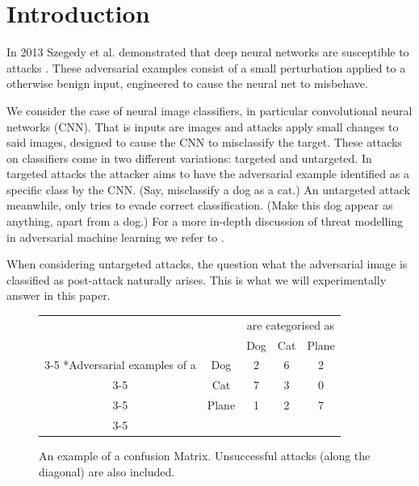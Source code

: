 \documentclass{article}
\begin{document}
\section{Introduction}



In 2013 Szegedy et al. demonstrated that deep neural networks are susceptible to attacks \cite{Szegedy13}. These adversarial examples consist of a small perturbation applied to a otherwise benign input, engineered to cause the neural net to misbehave.

We consider the case of neural image classifiers, in particular convolutional neural networks (CNN).
That is inputs are images and attacks apply small changes to said images, designed to cause the CNN to misclassify the target. These attacks on classifiers come in two different variations: targeted and untargeted.
In targeted attacks the attacker aims to have the adversarial example identified as a specific class by the CNN. (Say, misclassify a dog as a cat.)
An untargeted attack meanwhile, only tries to evade correct classification. (Make this dog appear as anything, apart from a dog.)
For a more in-depth discussion of threat modelling in adversarial machine learning we refer to \cite{biggio2018wild}.

When considering untargeted attacks, the question what the adversarial image is classified as post-attack naturally arises. This is what we will experimentally answer in this paper.

\begin{figure}[h]
	\begin{tabular}{cc|c|c|c|}
		& \multicolumn{1}{c}{} & \multicolumn{3}{c}{are categorised as}\\
		& \multicolumn{1}{c}{} & \multicolumn{1}{c}{Dog}  & \multicolumn{1}{c}{Cat} & \multicolumn{1}{c}{Plane} \\\cline{3-5}
		\multirow{3}*{Adversarial examples of a}  & Dog & 2 & 6 & 2\\\cline{3-5}
		& Cat & 7 & 3 &  0 \\\cline{3-5}
		& Plane & 1 & 2 &  7 \\\cline{3-5}
	\end{tabular}

	\caption{An example of a confusion Matrix. Unsuccessful attacks (along the diagonal) are also included.}
	\label{fig:matrixexample}
\end{figure}
\end{document}
